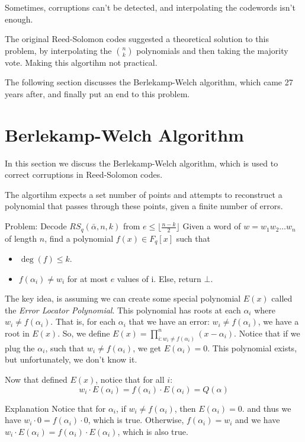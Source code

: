     Sometimes, corruptions can't be detected, and 
    interpolating the codewords isn't enough. 

    The original Reed-Solomon codes suggested a theoretical solution
    to this problem, by interpolating the $\binom{n}{k}$ polynomials
    and then taking the majority vote.
    Making this algortihm not practical.

    The following section discusses the Berlekamp-Welch algorithm,
    which came 27 years after, and finally put an end to this problem.
\section{Berlekamp-Welch Algorithm}
In this section we discuss the Berlekamp-Welch algorithm, 
which is used to correct corruptions in Reed-Solomon codes.

The algortihm expects a set number of points and attempts to reconstruct 
a polynomial that passes through these points, given a finite number of errors.

\begin{bclogo}[logo=\bcattention,noborder=true]{Problem: Decode 
    $RS_q(\bar{\alpha},n,k)$ from $e\le \lfloor\frac{n-k}{2}\rfloor$}
Given a word of $w=w_1w_2\dots w_n$ of length $n$, 
find a polynomial $f(x)\in F_q[x]$ such that
\begin{itemize}
    \item $\deg(f)\le k$.
    \item $f(\alpha_i)\ne w_i$ for at most $e$ values of i. Else, return $\bot$.
\end{itemize}

\end{bclogo}

The key idea, is assuming we can create some special polynomial $E(x)$ called
 the \emph{Error Locator Polynomial}.
This polynomial has roots at each $\alpha_i$ where $w_i\ne f(\alpha_i)$. That is, 
for each $\alpha_i$  that we have an error: $w_i\ne f(\alpha_i)$, we have a root in $E(x)$.
So, we define $ E(x) = \prod_{i:w_i\ne f(\alpha_i)}^{n} (x-\alpha_i)$.
Notice that if we plug the $\alpha_i$, such that $w_i\ne f(\alpha_i)$,
 we get $E(\alpha_i)=0$.
This polynomial exists, but unfortunately, we don't know it. 

Now that defined $E(x)$, notice that for all $i$:
$$ w_i\cdot E(\alpha_i) = f(\alpha_i)\cdot E(\alpha_i)= Q(\alpha)$$


\begin{bclogo}[logo=\bcinfo,noborder=true]{Explanation}
    Notice that for $\alpha_i$, if $w_i\ne f(\alpha_i)$, then $E(\alpha_i)=0$.
    and thus we have $w_i\cdot 0 = f(\alpha_i)\cdot 0$, which is true.
    Otherwise, $f(\alpha_i)=w_i$ and we have
     $w_i\cdot E(\alpha_i) = f(\alpha_i)\cdot E(\alpha_i)$, which is also true.
\end{bclogo}

